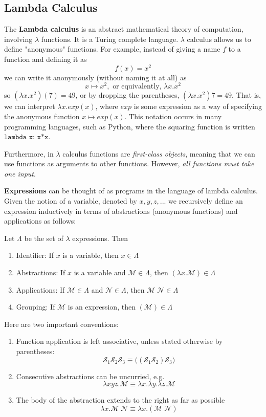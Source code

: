   \subsection{Lambda Calculus}
  The \textbf{Lambda calculus} is an abstract mathematical theory of computation, involving $\lambda$ functions. It is a Turing complete language. $\lambda$ calculus allows us to define "anonymous" functions. For example, instead of giving a name $f$ to a function and defining it as 
  \[f(x) = x^2\]
  we can write it anonymously (without naming it at all) as 
  \[x \mapsto x^2, \text{ or equivalently, } \lambda x . x^2\]
  so $(\lambda x.x^2) (7) = 49$, or by dropping the parentheses,  $(\lambda x.x^2) 7 = 49$. That is, we can interpret $\lambda x.exp(x)$, where $exp$ is some expression as a way of specifying the anonymous function $x \mapsto exp(x)$. This notation occurs in many programming languages, such as Python, where the squaring function is written $\texttt{lambda x: x*x}$.  

  Furthermore, in $\lambda$ calculus functions are \textit{first-class objects}, meaning that we can use functions as arguments to other functions. However, \textit{all functions must take one input}. 

  \textbf{Expressions} can be thought of as programs in the language of lambda calculus. Given the notion of a variable, denoted by $x, y, z, ...$ we recursively define an expression inductively in terms of abstractions (anonymous functions) and applications as follows: 

  \begin{definition}
  Let $\Lambda$ be the set of $\lambda$ expressions. Then 
  \begin{enumerate}
      \item Identifier: If $x$ is a variable, then $x \in \Lambda$ 
      \item Abstractions: If $x$ is a variable and $\mathcal{M} \in \Lambda$, then $(\lambda x.\mathcal{M}) \in \Lambda$
      \item Applications: If $\mathcal{M} \in \Lambda$ and $\mathcal{N} \in \Lambda$, then $\mathcal{M}\;\mathcal{N} \in \Lambda$
      \item Grouping: If $\mathcal{M}$ is an expression, then $( \mathcal{M}) \in \Lambda$
  \end{enumerate}
  Here are two important conventions: 
  \begin{enumerate}
      \item Function application is left associative, unless stated otherwise by parentheses:
      \[\mathcal{S}_1 \mathcal{S}_2 \mathcal{S}_3 \equiv \big( (\mathcal{S}_1 \mathcal{S}_2) \mathcal{S}_3 \big)\]
      \item Consecutive abstractions can be uncurried, e.g. 
      \[\lambda x y z . \mathcal{M} \equiv \lambda x . \lambda y . \lambda z . \mathcal{M} \]
      \item The body of the abstraction extends to the right as far as possible 
      \[\lambda x . \mathcal{M} \; \mathcal{N} \equiv \lambda x . ( \mathcal{M}\; \mathcal{N})\]
  \end{enumerate}
  \end{definition}

